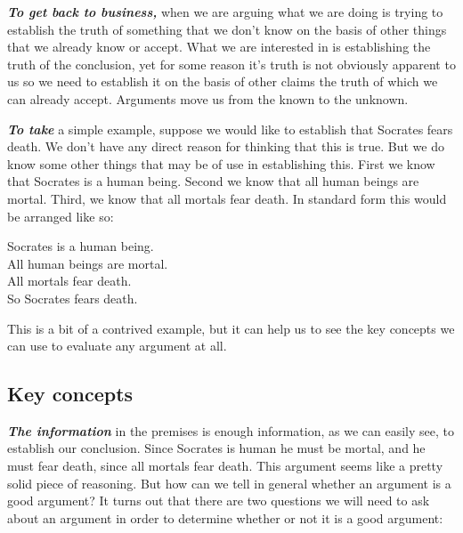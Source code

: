 \documentclass[12pt, openany]{book}
\begin{document}
\textbf{\emph{To get back to business,}} when we are arguing what we are doing is trying to establish the truth of something that we don't know on the basis of other things that we already know or accept. What we are interested in is establishing the truth of the conclusion, yet for some reason it's truth is not obviously apparent to us so we need to establish it on the basis of other claims the truth of which we can already accept. Arguments move us from the known to the unknown.

\textbf{\emph{To take}} a simple example, suppose we would like to establish that Socrates fears death. We don't have any direct reason for thinking that this is true. But we do know some other things that may be of use in establishing this. First we know that Socrates is a human being. Second we know that all human beings are mortal. Third, we know that all mortals fear death. In standard form this would be arranged like so:

\begin{center}

\begin{argument}

Socrates is a human being.\\
All human beings are mortal.\\
All mortals fear death.\\

So Socrates fears death.

\end{argument}

\end{center}

This is a bit of a contrived example, but it can help us to see the key concepts we can use to evaluate any argument at all.

\hypertarget{key-concepts}{%
\subsection*{Key concepts}\label{key-concepts}}


\textbf{\emph{The information}} in the premises is enough information, as we can easily see, to establish our conclusion. Since Socrates is human he must be mortal, and he must fear death, since all mortals fear death. This argument seems like a pretty solid piece of reasoning. But how can we tell in general whether an argument is a good argument? It turns out that there are two questions we will need to ask about an argument in order to determine whether or not it is a good argument:
\end{document}
